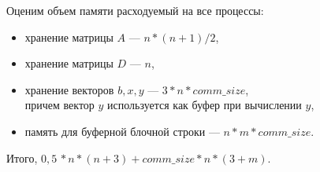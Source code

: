 \documentclass[a4paper,12pt]{article}
\begin{document}
    \bigskip
    Оценим объем памяти расходуемый на все процессы:
    \begin{itemize}
        \item хранение матрицы $A$ --- $n*(n+1)/2$,
        \item хранение матрицы $D$ --- $n$,
        \item хранение векторов $b, x, y$  --- $3 * n * comm\_size$, \\
        причем вектор $y$ используется как буфер при вычислении $y$,
        \item память для буферной блочной строки  --- $n * m * comm\_size$.
    \end{itemize}
    Итого, $0,5\,* n * (n+3) + comm\_size * n * (3 + m)$.
    
\end{document}
